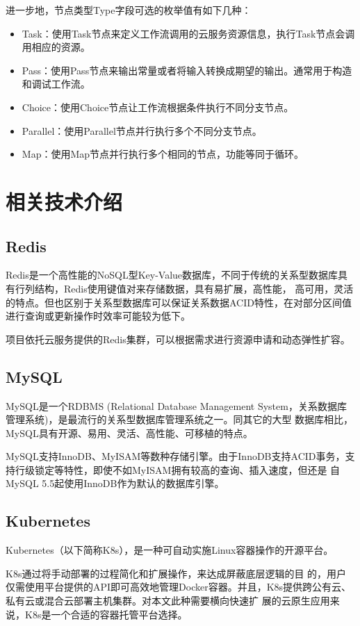 进一步地，节点类型Type字段可选的枚举值有如下几种：
\begin{itemize}
    \item Task：使用Task节点来定义工作流调用的云服务资源信息，执行Task节点会调用相应的资源。
    \item Pass：使用Pass节点来输出常量或者将输入转换成期望的输出。通常用于构造和调试工作流。
    \item Choice：使用Choice节点让工作流根据条件执行不同分支节点。
    \item Parallel：使用Parallel节点并行执行多个不同分支节点。
    \item Map：使用Map节点并行执行多个相同的节点，功能等同于循环。
\end{itemize}



\section{相关技术介绍}

\subsection{Redis}
Redis是一个高性能的NoSQL型Key-Value数据库，不同于传统的关系型数据库具有行列结构，Redis使用键值对来存储数据，具有易扩展，高性能，
高可用，灵活的特点。但也区别于关系型数据库可以保证关系数据ACID特性，在对部分区间值进行查询或更新操作时效率可能较为低下。

项目依托云服务提供的Redis集群，可以根据需求进行资源申请和动态弹性扩容。

\subsection{MySQL}
MySQL是一个RDBMS (Relational Database Management System，关系数据库管理系统)，是最流行的关系型数据库管理系统之一。同其它的大型
数据库相比，MySQL具有开源、易用、灵活、高性能、可移植的特点。

MySQL支持InnoDB、MyISAM等数种存储引擎。由于InnoDB支持ACID事务，支持行级锁定等特性，即使不如MyISAM拥有较高的查询、插入速度，但还是
自MySQL 5.5起使用InnoDB作为默认的数据库引擎。


\subsection{Kubernetes}
Kubernetes（以下简称K8s），是一种可自动实施Linux容器操作的开源平台。

K8s通过将手动部署的过程简化和扩展操作，来达成屏蔽底层逻辑的目
的，用户仅需使用平台提供的API即可高效地管理Docker容器。并且，K8s提供跨公有云、私有云或混合云部署主机集群。对本文此种需要横向快速扩
展的云原生应用来说，K8s是一个合适的容器托管平台选择\cite{zhong2021machine}。

